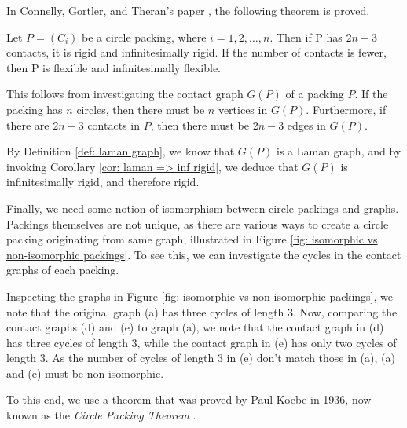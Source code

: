 \begin{flushleft}
In Connelly, Gortler, and Theran's paper \cite{sticky}, the following theorem is proved.
\end{flushleft}

\begin{theorem}
\label{thm: louis thm}
Let $P = (C_i)$ be a circle packing, where $i = 1,2,\hdots, n$. Then if P has $2n-3$ contacts, it is rigid and infinitesimally rigid. If the number of contacts is fewer, then P is flexible and infinitesimally flexible.
\end{theorem}

\begin{flushleft}
This follows from investigating the contact graph $G(P)$ of a packing $P$. If the packing has $n$ circles, then there must be $n$ vertices in $G(P)$. Furthermore, if there are $2n-3$ contacts in $P$, then there must be $2n-3$ edges in $G(P)$.
\end{flushleft}

\begin{flushleft}
By Definition \ref{def: laman graph}, we know that $G(P)$ is a Laman graph, and by invoking Corollary \ref{cor: laman => inf rigid}, we deduce that $G(P)$ is infinitesimally rigid, and therefore rigid. 
\end{flushleft}

\begin{flushleft}
Finally, we need some notion of isomorphism between circle packings and graphs. Packings themselves are not unique, as there are various ways to create a circle packing originating from same graph, illustrated in Figure \ref{fig: isomorphic vs non-isomorphic packings}. To see this, we can investigate the cycles in the contact graphs of each packing. 
\end{flushleft}

\begin{flushleft}
Inspecting the graphs in Figure \ref{fig: isomorphic vs non-isomorphic packings}, we note that the original graph (a) has three cycles of length 3. Now, comparing the contact graphs (d) and (e) to graph (a), we note that the contact graph in (d) has three cycles of length 3, while the contact graph in (e) has only two cycles of length 3. As the number of cycles of length 3 in (e) don't match those in (a), (a) and (e) must be non-isomorphic.
\end{flushleft}

\begin{flushleft}
To this end, we use a theorem that was proved by Paul Koebe in 1936, now known as the \textit{Circle Packing Theorem} \cite{circle_packing_theorem}.
\end{flushleft}

